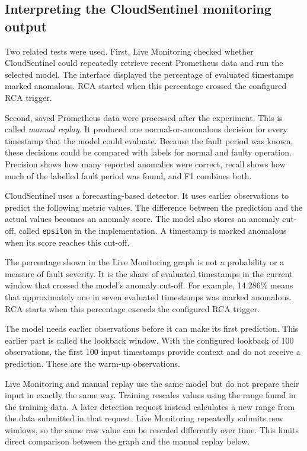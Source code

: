 \subsection{Interpreting the CloudSentinel monitoring output}
Two related tests were used. First, Live Monitoring checked whether CloudSentinel could repeatedly retrieve recent Prometheus data and run the selected model. The interface displayed the percentage of evaluated timestamps marked anomalous. RCA started when this percentage crossed the configured RCA trigger.

Second, saved Prometheus data were processed after the experiment. This is called \textit{manual replay}. It produced one normal-or-anomalous decision for every timestamp that the model could evaluate. Because the fault period was known, these decisions could be compared with labels for normal and faulty operation. Precision shows how many reported anomalies were correct, recall shows how much of the labelled fault period was found, and F1 combines both.

CloudSentinel uses a forecasting-based detector. It uses earlier observations to predict the following metric values. The difference between the prediction and the actual values becomes an anomaly score. The model also stores an anomaly cut-off, called \texttt{epsilon} in the implementation. A timestamp is marked anomalous when its score reaches this cut-off.

The percentage shown in the Live Monitoring graph is not a probability or a measure of fault severity. It is the share of evaluated timestamps in the current window that crossed the model's anomaly cut-off. For example, 14.286\% means that approximately one in seven evaluated timestamps was marked anomalous. RCA starts when this percentage exceeds the configured RCA trigger.

The model needs earlier observations before it can make its first prediction. This earlier part is called the lookback window. With the configured lookback of 100 observations, the first 100 input timestamps provide context and do not receive a prediction. These are the warm-up observations.

Live Monitoring and manual replay use the same model but do not prepare their input in exactly the same way. Training rescales values using the range found in the training data. A later detection request instead calculates a new range from the data submitted in that request. Live Monitoring repeatedly submits new windows, so the same raw value can be rescaled differently over time. This limits direct comparison between the graph and the manual replay below.

